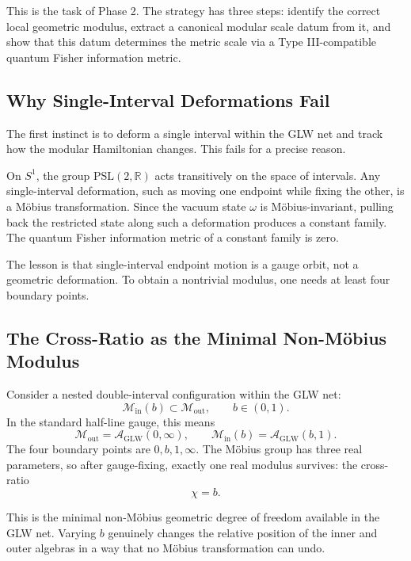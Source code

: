 \documentclass[12pt]{article}
\theoremstyle{definition}
\theoremstyle{remark}
\begin{document}
This is the task of Phase 2. The strategy has three steps: identify the
correct local geometric modulus, extract a canonical modular scale datum
from it, and show that this datum determines the metric scale via a Type
III-compatible quantum Fisher information metric.

\subsection{Why Single-Interval Deformations
Fail}\label{why-single-interval-deformations-fail}

The first instinct is to deform a single interval within the GLW net and
track how the modular Hamiltonian changes. This fails for a precise
reason.

On \(S^1\), the group \(\mathrm{PSL}(2,\mathbb{R})\) acts transitively
on the space of intervals. Any single-interval deformation, such as
moving one endpoint while fixing the other, is a Möbius transformation.
Since the vacuum state \(\omega\) is Möbius-invariant, pulling back the
restricted state along such a deformation produces a constant family.
The quantum Fisher information metric of a constant family is zero.

The lesson is that single-interval endpoint motion is a gauge orbit, not
a geometric deformation. To obtain a nontrivial modulus, one needs at
least four boundary points.

\subsection{The Cross-Ratio as the Minimal Non-Möbius
Modulus}\label{the-cross-ratio-as-the-minimal-non-muxf6bius-modulus}

Consider a nested double-interval configuration within the GLW net: \[
\mathcal{M}_{\mathrm{in}}(b) \subset \mathcal{M}_{\mathrm{out}},
\qquad b \in (0,1).
\] In the standard half-line gauge, this means \[
\mathcal{M}_{\mathrm{out}} = \mathcal{A}_{\mathrm{GLW}}(0,\infty),
\qquad
\mathcal{M}_{\mathrm{in}}(b) = \mathcal{A}_{\mathrm{GLW}}(b,1).
\] The four boundary points are \(0, b, 1, \infty\). The Möbius group
has three real parameters, so after gauge-fixing, exactly one real
modulus survives: the cross-ratio \[
\chi = b.
\]

This is the minimal non-Möbius geometric degree of freedom available in
the GLW net. Varying \(b\) genuinely changes the relative position of
the inner and outer algebras in a way that no Möbius transformation can
undo.
\end{document}
